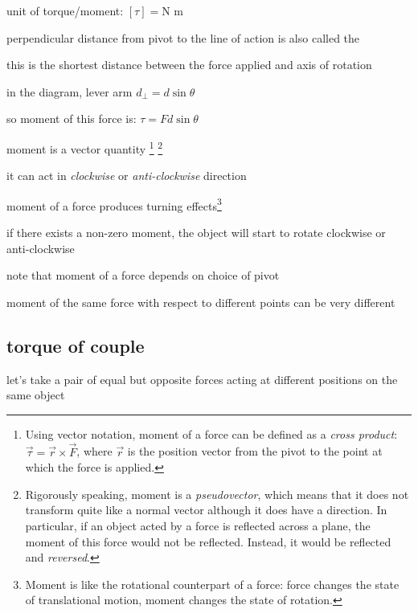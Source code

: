 \cmt unit of torque/moment: $[\tau] = \text{N m}$

\cmt perpendicular distance from pivot to the line of action is also called the 

this is the shortest distance between the force applied and axis of rotation

in the diagram, lever arm $d_\perp = d\sin\theta$

so moment of this force is: $\tau = Fd\sin\theta$

\cmt moment is a vector quantity
\footnote{Using vector notation, moment of a force can be defined as a \emph{cross product}: $\overrightarrow{\tau} = \overrightarrow{r}\times\overrightarrow{F}$, where $\overrightarrow{r}$ is the position vector from the pivot to the point at which the force is applied.}
\footnote{Rigorously speaking, moment is a \emph{pseudovector}, which means that it does not transform quite like a normal vector although it does have a direction. In particular, if an object acted by a force is reflected across a plane, the moment of this force would not be reflected. Instead, it would be reflected and \emph{reversed}.}

it can act in \emph{clockwise} or \emph{anti-clockwise} direction

\cmt moment of a force produces turning effects\footnote{Moment is like the rotational counterpart of a force: force changes the state of translational motion, moment changes the state of rotation.}

if there exists a non-zero moment, the object will start to rotate clockwise or anti-clockwise

\cmt note that moment of a force depends on choice of pivot

moment of the same force with respect to different points can be very different



\subsection{torque of couple}\label{ch:torque-of-couple}

let's take a pair of equal but opposite forces acting at different positions on the same object

\begin{marginfigure}
	\centering
	\vspace*{-8pt}
	\vspace*{-16pt}
\end{marginfigure}


